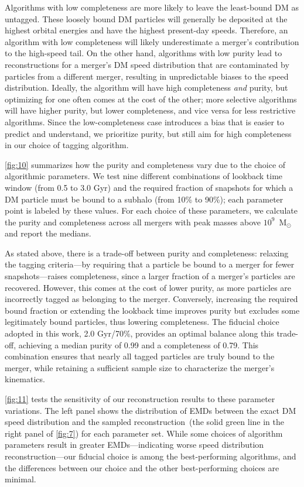 \documentclass[twocolumn,tighten,twocolappendix]{aastex701}
\begin{document}
Algorithms with low completeness are more likely to leave the least-bound DM as untagged. These loosely bound DM particles will generally be deposited at the highest orbital energies and have the highest present-day speeds. Therefore, an algorithm with low completeness will likely underestimate a merger's contribution to the high-speed tail. 
On the other hand, algorithms with low purity lead to reconstructions for a merger's DM speed distribution that are contaminated by particles from a different merger, resulting in unpredictable biases to the speed distribution. 
Ideally, the algorithm will have high completeness \emph{and} purity, but optimizing for one often comes at the cost of the other; more selective algorithms will have higher purity, but lower completeness, and vice versa for less restrictive algorithms. Since the low-completeness case introduces a bias that is easier to predict and understand, we prioritize purity, but still aim for high completeness in our choice of tagging algorithm. 

\autoref{fig:10} summarizes how the purity and completeness vary due to the choice of algorithmic parameters. We test nine different combinations of lookback time window (from 0.5 to 3.0 Gyr) and the required fraction of snapshots for which a DM particle must be bound to a subhalo (from 10\% to 90\%); each parameter point is labeled by these values. For each choice of these parameters, we calculate the purity and completeness across all mergers with peak masses above $10^9$~M$_\odot$ and report the medians.

As stated above, there is a trade-off between purity and completeness: relaxing the tagging criteria---by requiring that a particle be bound to a merger for fewer snapshots---raises completeness, since a larger fraction of a merger's particles are recovered. However, this comes at the cost of lower purity, as more particles are incorrectly tagged as belonging to the merger. Conversely, increasing the required bound fraction or extending the lookback time improves purity but excludes some legitimately bound particles, thus lowering completeness. The fiducial choice adopted in this work, 2.0 Gyr/70\%, provides an optimal balance along this trade-off, achieving a median purity of 0.99 and a completeness of 0.79. This combination ensures that nearly all tagged particles are truly bound to the merger, while retaining a sufficient sample size to characterize the merger's kinematics. 

\autoref{fig:11} tests the sensitivity of our reconstruction results to these parameter variations. The left panel shows the distribution of EMDs between the exact DM speed distribution and the sampled reconstruction~(the solid green line in the right panel of \autoref{fig:7}) for each parameter set. While some choices of algorithm parameters result in greater EMDs---indicating worse speed distribution reconstruction---our fiducial choice is among the best-performing algorithms, and the differences between our choice and the other best-performing choices are minimal.
\end{document}
